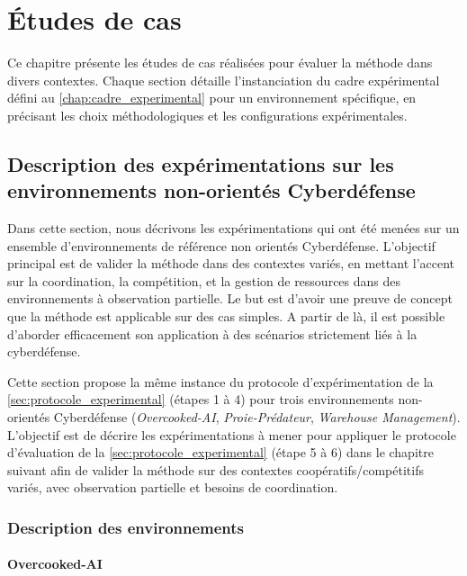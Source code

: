 \chapter{Études de cas}
\label{chap:case_studies}

Ce chapitre présente les études de cas réalisées pour évaluer la méthode  dans divers contextes. Chaque section détaille l'instanciation du cadre expérimental défini au \autoref{chap:cadre_experimental} pour un environnement spécifique, en précisant les choix méthodologiques et les configurations expérimentales.

\section{Description des expérimentations sur les environnements non-orientés Cyberdéfense}

Dans cette section, nous décrivons les expérimentations qui ont été menées sur un ensemble d'environnements de référence non orientés Cyberdéfense. L'objectif principal est de valider la méthode  dans des contextes variés, en mettant l'accent sur la coordination, la compétition, et la gestion de ressources dans des environnements à observation partielle. Le but est d'avoir une preuve de concept que la méthode  est applicable sur des cas simples. A partir de là, il est possible d'aborder efficacement son application à des scénarios strictement liés à la cyberdéfense.

Cette section propose la même instance du protocole d'expérimentation de la \autoref{sec:protocole_experimental} (étapes 1 à 4) pour trois environnements non-orientés Cyberdéfense (\textit{Overcooked-AI}, \textit{Proie-Prédateur}, \textit{Warehouse Management}).
L’objectif est de décrire les expérimentations à mener pour appliquer le protocole d'évaluation de la \autoref{sec:protocole_experimental} (étape 5 à 6) dans le chapitre suivant afin de valider la méthode  sur des contextes coopératifs/compétitifs variés, avec observation partielle et besoins de coordination.


\subsection{Description des environnements}

\subsubsection*{Overcooked-AI}

